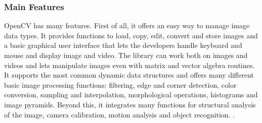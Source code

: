 	\subsubsection*{Main Features}
	OpenCV has many features. First of all, it offers an easy way to manage image data types. It provides functions to load, copy, edit, convert and store images and a basic graphical user interface that lets the developers handle keyboard and mouse and display image and video. The library can work both on images and videos and lets manipulate images even with matrix and vector algebra routines. It supports the most common dynamic data structures and offers many different basic image processing functions: filtering, edge and corner detection, color conversion, sampling and interpolation, morphological operations, histograms and image pyramids. Beyond this, it integrates many functions for structural analysis of the image, camera calibration, motion analysis and object recognition. \cite{Agam2006}.
